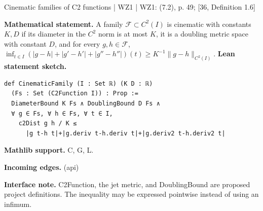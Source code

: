 \documentclass[10pt,a4paper]{article}
\newcommand{\nodecard}[1]{\hyperlink{node-#1}{\texttt{\detokenize{#1}}}}
\begin{document}
\begin{minipage}{\linewidth}
\hypertarget{node-Dcinematic}{}
\begin{tcolorbox}[colback=white,colframe=cinematicfg,colbacktitle=cinematicbg,coltitle=ink,boxrule=0.45pt,arc=1.6mm,left=3mm,right=3mm,top=2mm,bottom=2mm,title={\sffamily\bfseries WZ1 Definition 7.1 \hfill \texttt{Dcinematic}}]
{\sffamily\small\color{muted}Cinematic families of C2 functions | WZ1 | WZ1: (7.2), p. 49; [36, Definition 1.6]}\par
\textbf{Mathematical statement.} A family $\mathcal F\subset C^2(I)$ is cinematic with constants $K,D$ if its diameter in the $C^2$ norm is at most $K$, it is a doubling metric space with constant $D$, and for every $g,h\in\mathcal F$,
$\inf_{t\in I}(|g-h|+|g'-h'|+|g''-h''|)(t)\ge K^{-1}\|g-h\|_{C^2(I)}$.
\smallskip\textbf{Lean statement sketch.}
\begin{Verbatim}[fontsize=\small,breaklines=true,breakanywhere=true,tabsize=2]
def CinematicFamily (I : Set ℝ) (K D : ℝ)
  (Fs : Set (C2Function I)) : Prop :=
  DiameterBound K Fs ∧ DoublingBound D Fs ∧
  ∀ g ∈ Fs, ∀ h ∈ Fs, ∀ t ∈ I,
    c2Dist g h / K ≤
      |g t-h t|+|g.deriv t-h.deriv t|+|g.deriv2 t-h.deriv2 t|
\end{Verbatim}
{\footnotesize\textbf{Mathlib support.} C, G, L.\par
\textbf{Incoming edges.} \nodecard{Icalc} (api)\par}
{\footnotesize\textbf{Interface note.} C2Function, the jet metric, and DoublingBound are proposed project definitions. The inequality may be expressed pointwise instead of using an infimum.}
\end{tcolorbox}\end{minipage}\par\medskip
\end{document}
